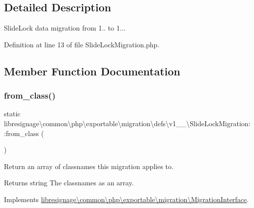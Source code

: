 \subsection{Detailed Description}
Slide\+Lock data migration from 1.. to 1... 

Definition at line 13 of file Slide\+Lock\+Migration.\+php.



\subsection{Member Function Documentation}
\mbox{\label{classlibresignage_1_1common_1_1php_1_1exportable_1_1migration_1_1defs_1_1v1__1__0_1_1SlideLockMigration_a44e07bcc7d52b43a82764ef77d890520}} 
\subsubsection{\texorpdfstring{from\+\_\+class()}{from\_class()}}
{\footnotesize\ttfamily static libresignage\textbackslash{}common\textbackslash{}php\textbackslash{}exportable\textbackslash{}migration\textbackslash{}defs\textbackslash{}v1\+\_\+\_\textbackslash{}\+Slide\+Lock\+Migration\+::from\+\_\+class (\begin{DoxyParamCaption}{ }\end{DoxyParamCaption})\hspace{0.3cm}{\ttfamily [static]}}

Return an array of classnames this migration applies to.

\begin{DoxyReturn}{Returns}
string The classnames as an array. 
\end{DoxyReturn}


Implements \hyperlink{interfacelibresignage_1_1common_1_1php_1_1exportable_1_1migration_1_1MigrationInterface_aa8eb2e4ff59358ae551061687540f724}{libresignage\textbackslash{}common\textbackslash{}php\textbackslash{}exportable\textbackslash{}migration\textbackslash{}\+Migration\+Interface}.




